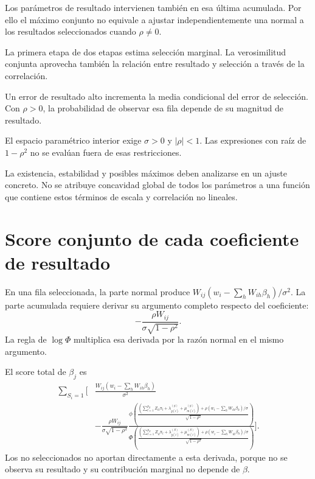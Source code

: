 \documentclass[11pt,a4paper]{article}
\begin{document}
Los parámetros de resultado
intervienen también en esa
última acumulada.
Por ello el máximo conjunto
no equivale a ajustar
independientemente una normal
a los resultados seleccionados
cuando \(\rho\ne0\).

La primera etapa de dos etapas
estima selección marginal.
La verosimilitud conjunta
aprovecha también la relación
entre resultado y selección
a través de la correlación.

\begin{ejemplo}
Un error de resultado alto
incrementa la media condicional
del error de selección.
Con \(\rho>0\),
la probabilidad de observar
esa fila depende de su
magnitud de resultado.
\end{ejemplo}
El espacio paramétrico interior
exige \(\sigma>0\) y \(|\rho|<1\).
Las expresiones con raíz
de \(1-\rho^2\) no
se evalúan fuera de
esas restricciones.

La existencia, estabilidad y
posibles máximos deben
analizarse en un ajuste concreto.
No se atribuye concavidad
global de todos los parámetros
a una función que contiene
estos términos de escala
y correlación no lineales.


\clearpage
\section{Score conjunto de cada coeficiente de resultado}

En una fila seleccionada,
la parte normal produce
\(W_{ij}(w_i-\sum_hW_{ih}\beta_h)/\sigma^2\).
La parte acumulada requiere
derivar su argumento completo
respecto del coeficiente:
\[
-\frac{\rho W_{ij}}{\sigma\sqrt{1-\rho^2}}.
\]
La regla de \(\log\Phi\)
multiplica esa derivada
por la razón normal
en el mismo argumento.

El score total de \(\beta_j\) es
\[
\begin{aligned}
\sum_{S_i=1}\Bigg[
&\frac{W_{ij}(w_i-\sum_hW_{ih}\beta_h)}{\sigma^2}\\
&-\frac{\rho W_{ij}}{\sigma\sqrt{1-\rho^2}}
\frac{
\phi\left(\frac{\left(\sum_{l=1}^{p_Z}Z_{il}\pi_l+\lambda_{y(i)}^{(S)}+\mu_{m(i)}^{(S)}\right)+
\rho(w_i-\sum_hW_{ih}\beta_h)/\sigma}{\sqrt{1-\rho^2}}\right)}
{\Phi\left(\frac{\left(\sum_{l=1}^{p_Z}Z_{il}\pi_l+\lambda_{y(i)}^{(S)}+\mu_{m(i)}^{(S)}\right)+
\rho(w_i-\sum_hW_{ih}\beta_h)/\sigma}{\sqrt{1-\rho^2}}\right)}
\Bigg].
\end{aligned}
\]
Los no seleccionados no
aportan directamente a esta
derivada, porque no se
observa su resultado y
su contribución marginal
no depende de \(\beta\).
\end{document}
